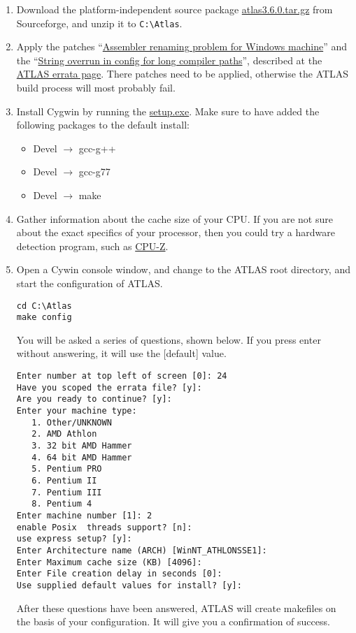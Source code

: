 \documentclass{article}
\begin{document}
\begin{enumerate}
\item Download the platform-independent source package
\href{http://prdownloads.sourceforge.net/math-atlas/atlas3.6.0.tar.gz?download}{atlas3.6.0.tar.gz}
from Sourceforge, and unzip it to \texttt{C:\textbackslash Atlas}.

\item Apply the patches ``\href{http://math-atlas.sourceforge.net/errata.html#winsse}
{Assembler renaming problem for Windows machine}'' and the 
``\href{http://math-atlas.sourceforge.net/errata.html#longcomp}{String overrun in config for long compiler paths}'',
described at the 
\href{http://math-atlas.sourceforge.net/errata.html}
{ATLAS errata page}. There patches need to be applied, otherwise the
ATLAS build process will most probably fail.

\item Install Cygwin by running the 
\href{http://www.cygwin.com/setup.exe}{setup.exe}. Make sure to have added the
following packages to the default install:
\begin{itemize}
\item Devel $\rightarrow$ gcc-g++
\item Devel $\rightarrow$ gcc-g77
\item Devel $\rightarrow$ make
\end{itemize}

\item Gather information about the cache size of your CPU.
If you are not sure about the exact specifics of your processor, then
you could try a hardware detection program, such as 
\href{http://www.cpuid.org/cpuz.php}{CPU-Z}.

\item Open a Cywin console window, and change to the ATLAS root
directory, and start the configuration of ATLAS.
%
\begin{verbatim}
cd C:\Atlas
make config
\end{verbatim}
%
You will be asked a series of questions, shown below. If you press enter 
without answering, it will use the [default] value. 
%
\begin{verbatim}
Enter number at top left of screen [0]: 24
Have you scoped the errata file? [y]:
Are you ready to continue? [y]:
Enter your machine type:
   1. Other/UNKNOWN
   2. AMD Athlon
   3. 32 bit AMD Hammer
   4. 64 bit AMD Hammer
   5. Pentium PRO
   6. Pentium II
   7. Pentium III
   8. Pentium 4
Enter machine number [1]: 2
enable Posix  threads support? [n]: 
use express setup? [y]:
Enter Architecture name (ARCH) [WinNT_ATHLONSSE1]:
Enter Maximum cache size (KB) [4096]:
Enter File creation delay in seconds [0]:
Use supplied default values for install? [y]:
\end{verbatim}
%
After these questions have been answered, ATLAS will create makefiles on the basis of your
configuration. It will give you a confirmation of success. 


\end{enumerate}
\end{document}
